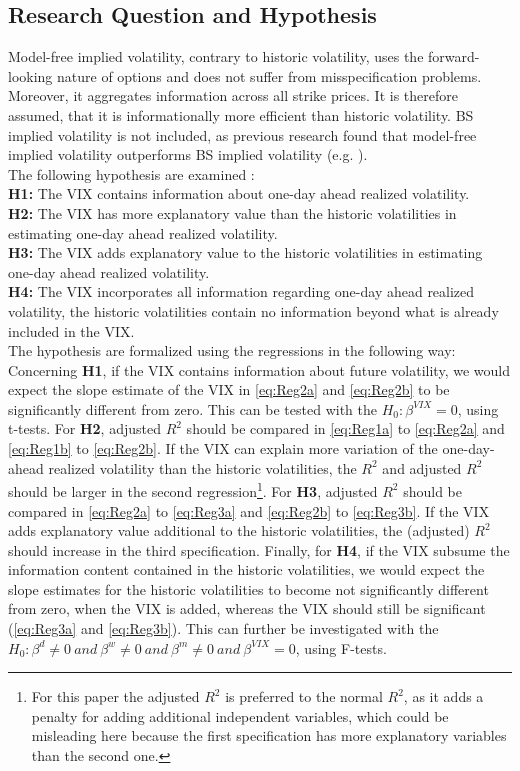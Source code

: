 \subsection{Research Question and Hypothesis}\label{sec:41aHypothesis}
Model-free implied volatility, contrary to historic volatility, uses the forward-looking nature of options and does not suffer from misspecification problems. Moreover, it aggregates information across all strike prices. It is therefore assumed, that it is informationally more efficient than historic volatility. \ac{BS} implied volatility is not included, as previous research found that model-free implied volatility outperforms \ac{BS} implied volatility (e.g. \textcite{jiang2003, bakanova2010}).\\
The following hypothesis are examined :\\
\textbf{\ac{H1}:} The \ac{VIX} contains information about one-day ahead realized volatility.\\
\textbf{\ac{H2}:} The \ac{VIX} has more explanatory value than the historic volatilities in estimating one-day ahead realized volatility.\\
\textbf{\ac{H3}:} The \ac{VIX} adds explanatory value to the historic volatilities in estimating one-day ahead realized volatility.\\
\textbf{\ac{H4}:} The \ac{VIX} incorporates all information regarding one-day ahead realized volatility, the historic volatilities contain no information beyond what is already included in the \ac{VIX}.\\
The hypothesis are formalized using the regressions in the following way:\\
Concerning \textbf{\ac{H1}}, if the \ac{VIX} contains information about future volatility, we would expect the slope estimate of the VIX in \ref{eq:Reg2a} and \ref{eq:Reg2b} to be significantly different from zero. This can be tested with the $H_{0}: \beta^{VIX} = 0$, using t-tests. For \textbf{\ac{H2}}, adjusted $R^{2}$ should be compared in \ref{eq:Reg1a} to \ref{eq:Reg2a} and \ref{eq:Reg1b} to \ref{eq:Reg2b}. If the \ac{VIX} can explain more variation of the one-day-ahead realized volatility than the historic volatilities, the $R^{2}$ and adjusted $R^{2}$ should be larger in the second regression\footnote{For this paper the adjusted $R^{2}$ is preferred to the normal $R^{2}$, as it adds a penalty for adding additional independent variables, which could be misleading here because the first specification has more explanatory variables than the second one.}. For \textbf{\ac{H3}}, adjusted $R^{2}$ should be compared in \ref{eq:Reg2a} to \ref{eq:Reg3a} and \ref{eq:Reg2b} to \ref{eq:Reg3b}. If the \ac{VIX} adds explanatory value additional to the historic volatilities, the (adjusted) $R^{2}$ should increase in the third specification. Finally, for \textbf{\ac{H4}}, if the VIX subsume the information content contained in the historic volatilities, we would expect the slope estimates for the historic volatilities to become not significantly different from zero, when the VIX is added, whereas the VIX should still be significant (\ref{eq:Reg3a} and \ref{eq:Reg3b}). This can further be investigated with the $H_{0}: \beta^{d} \neq 0 \ and \ \beta^{w} \neq 0 \ and \ \beta^{m} \neq 0 \ and \ \beta^{VIX} = 0$, using F-tests.

